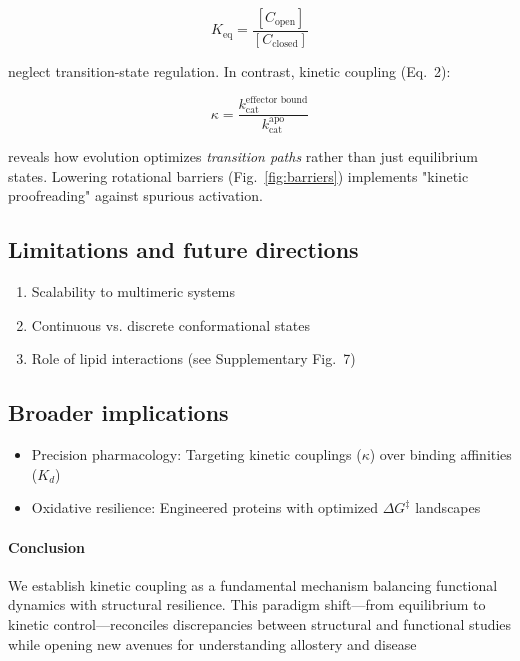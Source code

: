 \documentclass[a4paper,12pt]{article}
\begin{document}
	\begin{equation}
		K_{\text{eq}} = \frac{[C_{\text{open}}]}{[C_{\text{closed}}]}
	\end{equation}
	
	neglect transition-state regulation. In contrast, kinetic coupling (Eq.~2):
	
	\begin{equation}
		\kappa = \frac{k_{\text{cat}}^{\text{effector\ bound}}}{k_{\text{cat}}^{\text{apo}}}
	\end{equation}
	
	reveals how evolution optimizes \textit{transition paths} rather than just equilibrium states. Lowering rotational barriers (Fig.~\ref{fig:barriers}) implements "kinetic proofreading" against spurious activation.
	
	\subsection*{Limitations and future directions}
	\begin{enumerate}
		\item Scalability to multimeric systems
		\item Continuous vs. discrete conformational states
		\item Role of lipid interactions (see Supplementary Fig.~7)
	\end{enumerate}
	
	\subsection*{Broader implications}
	\begin{itemize}
		\item Precision pharmacology: Targeting kinetic couplings ($\kappa$) over binding affinities ($K_d$)
		\item Oxidative resilience: Engineered proteins with optimized $\Delta G^{\ddagger}$ landscapes
	\end{itemize}
	
	\paragraph*{Conclusion} We establish kinetic coupling as a fundamental mechanism balancing functional dynamics with structural resilience. This paradigm shift—from equilibrium to kinetic control—reconciles discrepancies between structural and functional studies while opening new avenues for understanding allostery and disease 
	
\end{document}
